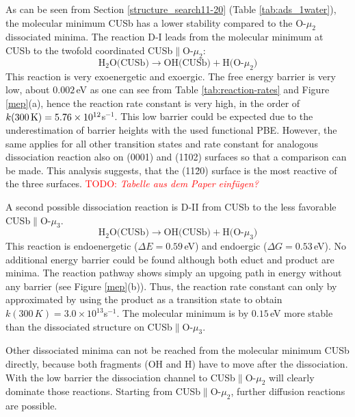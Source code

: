 \documentclass[11pt,DIV=13,BCOR=5mm,a4paper,headinclude]{scrbook}
\newcommand\todo[1]{\textcolor{red}{TODO: \textit{{#1}}}}
\begin{document}
As can be seen from Section \ref{structure_search11-20} (Table \ref{tab:ads_1water}), the molecular minimum CUSb has a lower stability compared to the O-$\mu_2$ dissociated minima.
The reaction D-I leads from the molecular minimum at CUSb to the twofold coordinated CUSb$\parallel$O-$\mu_2$:
 \begin{equation}
 \text{H$_2$O(CUSb)} \rightarrow \text{OH(CUSb)} + \text{H(O-$\mu_2$)} \tag{D-I}
      \label{dissa}
\end{equation}
This reaction is very exoenergetic and exoergic.
The free energy barrier is very low, about $0.002\,$eV as one can see from Table \ref{tab:reaction-rates} and Figure \ref{mep}(a), hence the reaction rate constant is very high, in the order of $k(\textrm{300\,K})=5.76\times 10^{12}$s$^{-1}$.
This low barrier could be expected due to the underestimation of barrier heights\cite{Zhao05} with the used functional PBE. %
However, the same applies for all other transition states and rate constant for analogous dissociation reaction also on (0001) and (1\=102) surfaces so that a comparison can be made.
This analysis suggests, that the (11\=20) surface is the most reactive of the three surfaces\cite{WirthJPCC2012,Wirth2016}. \todo{Tabelle aus dem Paper einfügen?}



A second possible dissociation reaction is D-II from CUSb to the less favorable CUSb$\parallel$O-$\mu_3$.
\begin{equation}
  \text{H$_2$O(CUSb)} \rightarrow \text{OH(CUSb)} + \text{H(O-$\mu_3$)} \tag{D-II}
      \label{dissb}
\end{equation}
This reaction is endoenergetic ($\Delta E=0.59\,$eV) and endoergic ($\Delta G=0.53\,$eV).
No additional energy barrier could be found although both educt and product are minima.
The reaction pathway shows simply an upgoing path in energy without any barrier (see Figure \ref{mep}(b)).
Thus, the reaction rate constant can only by approximated by using the product as a transition state to obtain $k(300\,K)=3.0\times 10^{13}$s$^{-1}$.
The molecular minimum is by $0.15\,$eV more stable than the dissociated structure on CUSb$\parallel$O-$\mu_3$.

Other dissociated minima can not be reached from the molecular minimum CUSb directly, because both fragments (OH and H) have to move after the dissociation.
With the low barrier the dissociation channel to CUSb$\parallel$O-$\mu_2$ will clearly dominate those reactions.
Starting from CUSb$\parallel$O-$\mu_2$, further diffusion reactions are possible.
\end{document}
